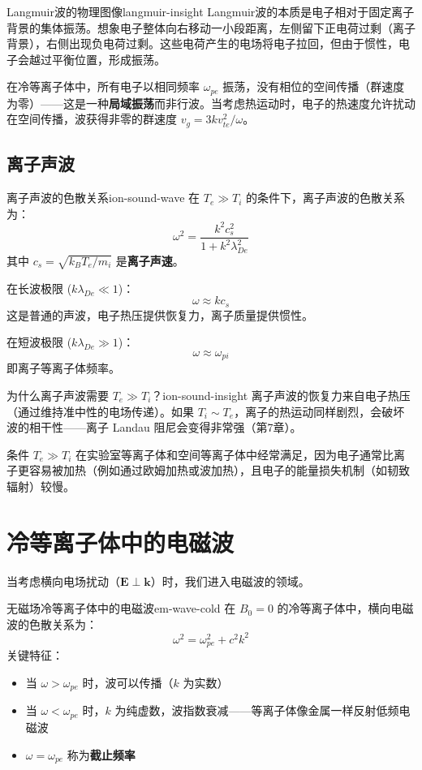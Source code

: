 \documentclass[12pt,a4paper,openany,oneside]{book}
\newcommand{\vect}[1]{\bm{#1}}
\newcommand{\difficulty}[1]{\marginnote{\textcolor{red}{\textbf{[#1]}}}}
\begin{document}
\begin{insight}{Langmuir波的物理图像}{langmuir-insight}
Langmuir波的本质是电子相对于固定离子背景的集体振荡。想象电子整体向右移动一小段距离，左侧留下正电荷过剩（离子背景），右侧出现负电荷过剩。这些电荷产生的电场将电子拉回，但由于惯性，电子会越过平衡位置，形成振荡。

在冷等离子体中，所有电子以相同频率 $\omega_{pe}$ 振荡，没有相位的空间传播（群速度为零）——这是一种\textbf{局域振荡}而非行波。当考虑热运动时，电子的热速度允许扰动在空间传播，波获得非零的群速度 $v_g = 3kv_{te}^2/\omega$。
\end{insight}

\subsection{离子声波}

\begin{theorem}{离子声波的色散关系}{ion-sound-wave}
在 $T_e \gg T_i$ 的条件下，离子声波的色散关系为：
\[
\omega^2 = \frac{k^2 c_s^2}{1 + k^2\lambda_{De}^2}
\]
其中 $c_s = \sqrt{k_B T_e/m_i}$ 是\textbf{离子声速}。

在长波极限 ($k\lambda_{De} \ll 1$)：
\[
\omega \approx k c_s
\]
这是普通的声波，电子热压提供恢复力，离子质量提供惯性。

在短波极限 ($k\lambda_{De} \gg 1$)：
\[
\omega \approx \omega_{pi}
\]
即离子等离子体频率。
\end{theorem}

\begin{insight}{为什么离子声波需要 $T_e \gg T_i$？}{ion-sound-insight}
离子声波的恢复力来自电子热压（通过维持准中性的电场传递）。如果 $T_i \sim T_e$，离子的热运动同样剧烈，会破坏波的相干性——离子 Landau 阻尼会变得非常强（第7章）。

条件 $T_e \gg T_i$ 在实验室等离子体和空间等离子体中经常满足，因为电子通常比离子更容易被加热（例如通过欧姆加热或波加热），且电子的能量损失机制（如韧致辐射）较慢。
\end{insight}

\section{冷等离子体中的电磁波}\difficulty{基础}

当考虑横向电场扰动（$\vect{E}\perp\vect{k}$）时，我们进入电磁波的领域。

\begin{theorem}{无磁场冷等离子体中的电磁波}{em-wave-cold}
在 $B_0=0$ 的冷等离子体中，横向电磁波的色散关系为：
\[
\omega^2 = \omega_{pe}^2 + c^2 k^2
\]
关键特征：
\begin{itemize}
\item 当 $\omega > \omega_{pe}$ 时，波可以传播（$k$ 为实数）
\item 当 $\omega < \omega_{pe}$ 时，$k$ 为纯虚数，波指数衰减——等离子体像金属一样反射低频电磁波
\item $\omega = \omega_{pe}$ 称为\textbf{截止频率}
\end{itemize}
\end{theorem}
\end{document}
